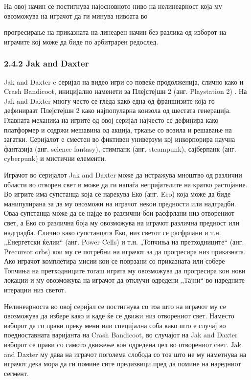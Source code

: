 На овој начин се постигнува најосновното ниво на нелинеарност која му овозможува на играчот да ги минува нивоата во


прогресирање на приказната на линеарен начин без разлика од изборот на играчите кој може да биде по арбитрарен редослед.

\subsubsection{2.4.2 Jak and Daxter}

Jak and Daxter e серијал на видео игри со повеќе продолженија, слично како и Crash Bandicoot, иницијално наменети за Плејстејшн 2 (анг. Playstation 2) \cite{ref17}. На Jak and Daxter многу често се гледа како една од франшизите која го дефинираат Плејстејшн 2 како најпопуларна конзола од шестата генерација. Главната механика на игрите од овој серијал најчесто се дефинира како платформер и содржи мешавина од акција, тркање со возила и решавање на загатки. Серијалот е сместен во фиктивен универзум кој инкорпорира научна фантазија (анг. science fantasy), стимпанк (анг. steampunk), сајберпанк (анг. cyberpunk) и мистични елементи.

Играчот во серијалот Jak and Daxter може да истражува мноштво од различни области во отворен свет и може да ги напаѓа непријателите на кратко растојание. Во игрите има супстанца која се нарекува Еко (анг. Eco) која може да биде манипулирана за да му овозможи на играчот некои предности или надградби. Оваа супстанца може да се најде во различни бои расфрлани низ отворениот свет, а Еко со различна боја му овозможува на играчот различна предност или надградба. Слично како супстанцата Еко, низ светот се расфрлани и т.н. „Енергетски ќелии“ (анг. Power Cells) и т.н. „Топчиња на претходниците“ (анг. Precursor orbs) кои му се потребни на играчот за да прогресира низ приказната. Ако играчот комплетира мисии кои се поврзани со приказната или собере Топчиња на претходниците тогаш играта му овозможува да прогресира кон нови локации и му овозможува на играчот да отклучи одредени „Тајни“ во наредните итерации низ светот.

Нелинеарноста во овој серијал се постигнува со тоа што на играчот му се овозможува да избере како и каде ќе се движи низ отворениот свет. Наместо изборот да го прави преку мени или специјална соба како што е случај во поедноставната варијанта на Crash Bandicoot, во случајот на Jak and Daxter изборот се прави со самото движење кон одредена цел во отворениот свет. Jak and Daxter му дава на играчот поголема слобода со тоа што не му наметнува на играчот дека мора да ги помине сите предизвици пред да помине на наредниот сегмент.

